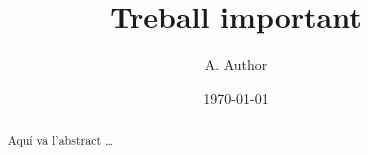 \documentclass{article}
\title{Treball important}
\author{A. Author}
\date{\today}
\begin{document}
\maketitle

\begin{abstract}
    Aquí va l'abstract \dots
\end{abstract}
\end{document}
